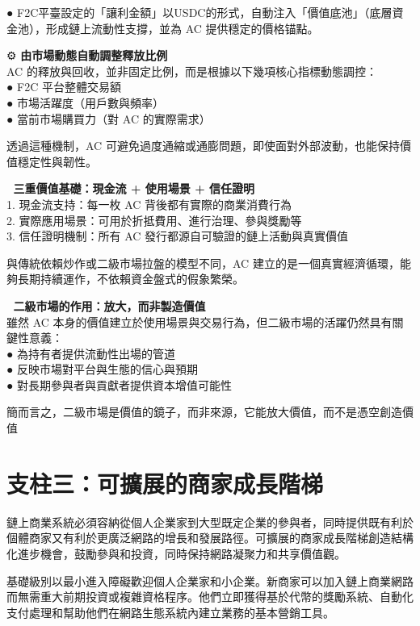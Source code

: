 \documentclass[
  Letterpaper,
]{scrbook}
\begin{document}
●
F2C平臺設定的「讓利金額」以USDC的形式，自動注入「價值底池」（底層資金池），形成鏈上流動性支撐，並為
AC 提供穩定的價格锚點。

⚙️ \textbf{由市場動態自動調整釋放比例}\\
AC 的釋放與回收，並非固定比例，而是根據以下幾項核心指標動態調控：\\
● F2C 平台整體交易額\\
● 市場活躍度（用戶數與頻率）\\
● 當前市場購買力（對 AC 的實際需求）

透過這種機制，AC
可避免過度通縮或通膨問題，即使面對外部波動，也能保持價值穩定性與韌性。

🧱 \textbf{三重價值基礎：現金流 + 使用場景 + 信任證明}\\
1. 現金流支持：每一枚 AC 背後都有實際的商業消費行為\\
2. 實際應用場景：可用於折抵費用、進行治理、參與獎勵等\\
3. 信任證明機制：所有 AC 發行都源自可驗證的鏈上活動與真實價值

與傳統依賴炒作或二級市場拉盤的模型不同，AC
建立的是一個真實經濟循環，能夠長期持續運作，不依賴資金盤式的假象繁榮。

🔁 \textbf{二級市場的作用：放大，而非製造價值}\\
雖然 AC
本身的價值建立於使用場景與交易行為，但二級市場的活躍仍然具有關鍵性意義：\\
● 為持有者提供流動性出場的管道\\
● 反映市場對平台與生態的信心與預期\\
● 對長期參與者與貢獻者提供資本增值可能性

簡而言之，二級市場是價值的鏡子，而非來源，它能放大價值，而不是憑空創造價值

\section{支柱三：可擴展的商家成長階梯}\label{ux652fux67f1ux4e09ux53efux64f4ux5c55ux7684ux5546ux5bb6ux6210ux9577ux968eux68af}

鏈上商業系統必須容納從個人企業家到大型既定企業的參與者，同時提供既有利於個體商家又有利於更廣泛網路的增長和發展路徑。可擴展的商家成長階梯創造結構化進步機會，鼓勵參與和投資，同時保持網路凝聚力和共享價值觀。

基礎級別以最小進入障礙歡迎個人企業家和小企業。新商家可以加入鏈上商業網路而無需重大前期投資或複雜資格程序。他們立即獲得基於代幣的獎勵系統、自動化支付處理和幫助他們在網路生態系統內建立業務的基本營銷工具。
\end{document}
